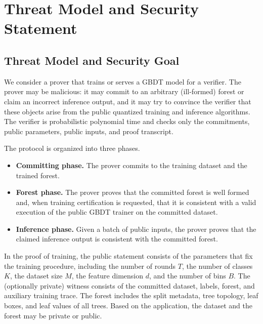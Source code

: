 \section{Threat Model and Security Statement}
\label{sec:threat-model}

\subsection{Threat Model and Security Goal}\label{subsec:threat-model-security-goal}

We consider a prover that trains or serves a GBDT model for a verifier. The
prover may be malicious: it may commit to an arbitrary
(ill-formed) forest or claim an incorrect inference output, and it may try to convince the
verifier that these objects arise from the public quantized training and
inference algorithms. The verifier is probabilistic polynomial time and checks
only the commitments, public parameters, public inputs, and proof transcript.

The protocol is organized into three phases.
\begin{itemize}
    \item \textbf{Committing phase.} The prover commits to the training dataset
    and the trained forest.

    \item \textbf{Forest phase.} The prover proves that the committed forest is
    well formed and, when training certification is requested, that it is
    consistent with a valid execution of the public GBDT trainer on the
    committed dataset.

    \item \textbf{Inference phase.} Given a batch of public inputs, the prover
    proves that the claimed inference output is consistent with the committed
    forest.
\end{itemize}

In the proof of training, the public statement consists of the parameters that
fix the training procedure, including the number of rounds $T$, the number of
classes $K$, the dataset size $M$, the feature dimension $d$, and the number of bins
$B$. The (optionally private) witness consists of the committed
dataset, labels, forest, and auxiliary training trace. The forest includes the
split metadata, tree topology, leaf boxes, and leaf values of all trees. Based
on the application, the dataset and the forest may be private or public.

